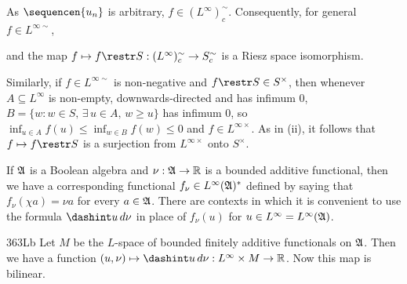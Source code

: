 {

\noindent As $\sequencen{u_n}$ is arbitrary,
$f\in(L^{\infty})^{\sim}_c$.   Consequently, for general
$f\in L^{\infty\sim}$,


\noindent and the map $f\mapsto f\restr S:(L^{\infty})^{\sim}_c\to
S^{\sim}_c$ is a Riesz space isomorphism.

\medskip

 Similarly, if $f\in L^{\infty\sim}$ is non-negative and
$f\restr S\in S^{\times}$, then whenever $A\subseteq L^{\infty}$ is
non-empty, downwards-directed and has infimum $0$,
$B=\{w:w\in S,\,\exists\,u\in A,\,w\ge u\}$ has infimum $0$, so
$\inf_{u\in A}f(u)\le\inf_{w\in B}f(w)\le 0$ and $f\in L^{\infty\times}$.
As in (ii), it follows that $f\mapsto f\restr S$ is a surjection from
$L^{\infty\times}$ onto $S^{\times}$.
}%

 If $\frak A$ is a Boolean algebra and
$\nu:\frak A\to\Bbb R$ is a bounded additive functional,
then we
have a corresponding functional $f_{\nu}\in L^{\infty}(\frak A)^*$
defined by saying that $f_{\nu}(\chi a)=\nu a$ for every $a\in\frak A$.
There are contexts in which it is convenient to use
the formula $\dashint u\,d\nu$ in place of $f_{\nu}(u)$ for
$u\in L^{\infty}=L^{\infty}(\frak A)$.   

\spheader 363Lb Let $M$ be the $L$-space of bounded finitely additive
functionals on $\frak A$.   Then we have a function
$(u,\nu)\mapsto\dashint u\,d\nu:L^{\infty}\times M\to\Bbb R$.
Now this map
is bilinear.   

